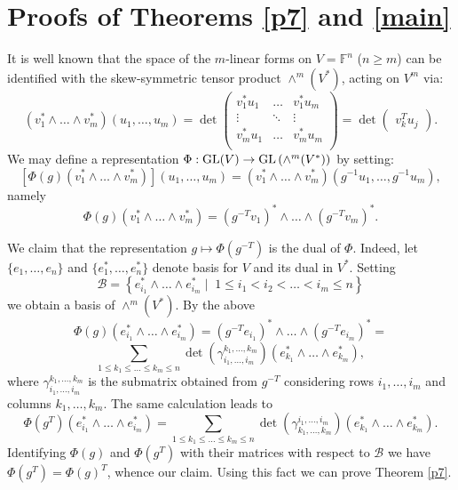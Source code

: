 \documentclass{amsart}
\theoremstyle{remark}
\begin{document}
\section{Proofs of Theorems \ref{p7} and \ref{main}}

It is well known that the space of the $m$-linear forms on $V={\mathbb{F}}^n$ ($n\geq m$) can be
identified with the skew-symmetric tensor product $\wedge^m(V^\ast)$, acting on $V^m$ via:
\begin{equation}
(v_1^\ast \wedge\ldots\wedge
v_m^\ast)(u_1,\ldots,u_m)=\det \begin{pmatrix}
v_1^\ast u_1 &  \ldots & v_1^\ast u_m\\
\vdots & \ddots & \vdots\\
v_m^\ast u_1  & \ldots & v_m^\ast u_m\\
 \end{pmatrix}=\det \begin{pmatrix}
v_k^T u_j
\end{pmatrix}.
\end{equation}
We may define a representation $\Phi: {\mathop{\rm GL}\nolimits}(V)\rightarrow {\mathop{\rm GL}\nolimits}\left(\wedge^m(
V^\ast)\right)$ by setting:
$$[\Phi(g)(v_1^\ast \wedge \ldots\wedge
v_{m}^\ast)](u_1,\ldots,u_m)=(v_1^\ast \wedge\ldots\wedge
v_{m}^\ast)(g^{-1} u_1,\ldots,g^{-1}u_m),$$
namely
$$
\Phi(g)(v_1^\ast \wedge\ldots\wedge
v_{m}^\ast)=\left(g^{-T}v_1\right)^\ast \wedge \ldots\wedge
\left(g^{-T} v_m\right)^\ast.
$$ 

We claim that the representation $g\mapsto \Phi\left(g^{-T}\right)$
is the dual of $\Phi$.
Indeed, let $\{e_1,\ldots,e_n\}$ and $\{e_1^\ast,\ldots,e_n^\ast\}$
denote basis for $V$ and its dual in $V^\ast$. Setting
$$\mathcal{B}=\left\{e_{i_1}^\ast \wedge\ldots\wedge e_{i_m}^\ast \mid\;  1\leq
i_1< i_2<
\ldots < i_m\leq n\right\}$$
we obtain a basis of $\wedge^m(V^\ast)$.
By the above
$$
\Phi(g)\left(e_{i_1}^\ast \wedge\ldots\wedge
e_{i_m}^\ast\right)=
\left( g^{-T} e_{i_1}\right)^\ast \wedge \ldots\wedge
\left( g^{-T}e_{i_m}\right)^\ast=$$ 
$$\sum_{1\le k_1\le\dots \le k_m\le n} \det \left(\gamma_{i_1,\dots ,i_m}^{k_1,\dots
,k_m}\right)\left(e_{k_1}^\ast \wedge\ldots\wedge e_{k_m}^\ast\right),
$$
where  $\gamma_{i_1,\dots ,i_m}^{k_1,\dots ,k_m}$ is the submatrix
obtained from $g^{-T}$ considering  rows $i_1,\dots ,i_m$ and columns $k_1,\dots
,k_m$.
The same calculation leads to
$$
\Phi(g^T)\left(e_{i_1}^\ast \wedge\ldots\wedge e_{i_m}^\ast\right) =
\sum_{1\le k_1\le\dots \le k_m\le n} \det \left(\gamma_{k_1,\dots ,k_m}^{i_1,\dots
,i_m}\right)\left(e_{k_1}^\ast \wedge\ldots\wedge e_{k_m}^\ast\right).$$
Identifying $\Phi(g)$ and $\Phi\left(g^T\right)$ with their matrices with respect to
$\mathcal{B}$
we have $\Phi\left(g^T\right)=\Phi(g)^T$, whence our claim.
Using this fact we can prove Theorem \ref{p7}.
\end{document}
